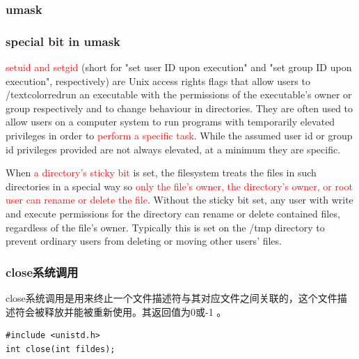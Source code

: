 \documentclass{beamer}
\begin{document}
\begin{frame}
\frametitle{umask}
\end{frame}
\begin{frame}
\frametitle{special bit in umask}
\textcolor{red}{setuid and setgid} (short for "set user ID upon execution" and "set group ID upon execution", respectively) are Unix access rights flags that allow users to /textcolor{red}{run an executable with the permissions of the executable's owner or group respectively} and to change behaviour in directories. They are often used to allow users on a computer system to run programs with temporarily elevated privileges in order to \textcolor{red}{perform a specific task}. While the assumed user id or group id privileges provided are not always elevated, at a minimum they are specific.

When \textcolor{red}{a directory's sticky bit} is set, the filesystem treats the files in such directories in a special way so \textcolor{red}{only the file's owner, the directory's owner, or root user can rename or delete the file}. Without the sticky bit set, any user with write and execute permissions for the directory can rename or delete contained files, regardless of the file's owner. Typically this is set on the /tmp directory to prevent ordinary users from deleting or moving other users' files.
\end{frame}
\begin{frame}[fragile]
\frametitle{close系统调用}
close系统调用是用来终止一个文件描述符与其对应文件之间关联的，这个文件描述符会被释放并能被重新使用。其返回值为0或-1 。
\begin{example}[close系统调用的原型]
\begin{verbatim}
#include <unistd.h>
int close(int fildes);
\end{verbatim}
\end{example}


\end{frame}
\end{document}
